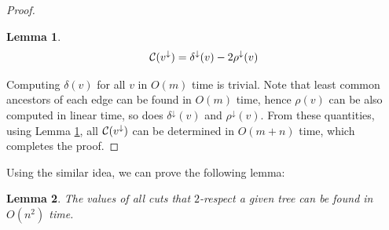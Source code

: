 \documentclass[12pt]{article}
\newcommand{\descendants}[1]{#1^\downarrow}
\newcommand{\cutval}[1]{{\cal C}(#1)}
\theoremstyle{plain}
\newtheorem{lemma}{Lemma}[section]
\begin{document}
\begin{proof}
    \begin{lemma}
        \label{lemma:delta}
        \begin{align*}
            \cutval{\descendants{v}} = \descendants{\delta}(v)-2\descendants{\rho}(v)
        \end{align*}
    \end{lemma}

    Computing $\delta(v)$ for all $v$ in $O(m)$ time is trivial. Note that least common ancestors of each edge can be found in $O(m)$ time\cite{gabow1983linear}, hence $\rho(v)$ can be also computed in linear time, so does $\descendants{\delta}(v)$ and $\descendants{\rho}(v)$. From these quantities, using Lemma \ref{lemma:delta}, all $\cutval{\descendants{v}}$ can be determined in $O(m+n)$ time, which completes the proof.
\end{proof}

Using the similar idea, we can prove the following lemma:

\begin{lemma}
    \label{lemma:respect}
    The values of all cuts that $2$-respect a given tree can be found in $O(n^2)$ time.
\end{lemma}
\end{document}
